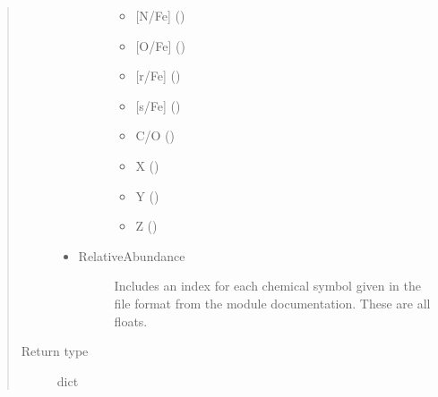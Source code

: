 \documentclass[letterpaper,10pt,english]{sphinxmanual}
\begin{document}
\begin{fulllineitems}
\begin{quote}
\begin{description}
\begin{itemize}
\begin{description}
\begin{itemize}
\item {} 
\sphinxAtStartPar
{[}N/Fe{]} ()

\item {} 
\sphinxAtStartPar
{[}O/Fe{]} ()

\item {} 
\sphinxAtStartPar
{[}r/Fe{]} ()

\item {} 
\sphinxAtStartPar
{[}s/Fe{]} ()

\item {} 
\sphinxAtStartPar
C/O ()

\item {} 
\sphinxAtStartPar
X ()

\item {} 
\sphinxAtStartPar
Y ()

\item {} 
\sphinxAtStartPar
Z ()

\end{itemize}

\end{description}

\item {} \begin{description}
\item[{RelativeAbundance}] \leavevmode
\sphinxAtStartPar
Includes an index for each chemical symbol given in the
file format from the module documentation. These are all
floats.

\end{description}

\end{itemize}


\item[{Return type}] \leavevmode
\sphinxAtStartPar
dict

\end{description}\end{quote}

\end{fulllineitems}

\end{document}
